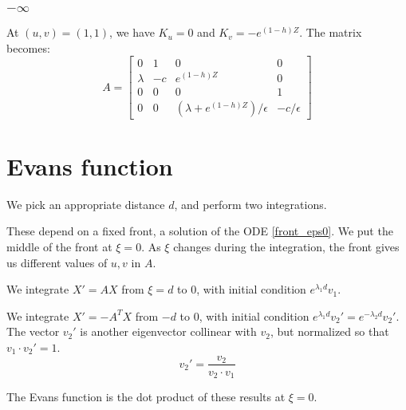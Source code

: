 \documentclass[10pt]{article}
\begin{document}
\subsubsection{$-\infty$}
At $(u,v) = (1,1)$, we have $K_u = 0$ and $K_v = -e^{(1-h)Z}$.
The matrix becomes:
\[
A = \begin{bmatrix}
0 & 1 & 0 & 0 \\
\lambda &  -c  &  e^{(1-h)Z}  & 0 \\
0 & 0 & 0 & 1 \\
0 &  0  &  (\lambda + e^{(1-h)Z})/\epsilon  &  - c / \epsilon
\end{bmatrix}
\]


\section{Evans function}
We pick an appropriate distance $d$, and perform two integrations.

These depend on a fixed front, a solution of the ODE \eqref{front_eps0}.
We put the middle of the front at $\xi = 0$.  As $\xi$ changes during the integration, the front gives us different values of $u,v$ in $A$.

We integrate $X' = AX$ from $\xi = d$ to $0$, with initial condition $e^{\lambda_1 d}v_1$.

We integrate $X' = -A^T X$ from $-d$ to $0$, with initial condition $e^{\lambda_1 d}v_2' = e^{-\lambda_2 d}v_2'$. The vector $v_2'$ is another eigenvector collinear with $v_2$, but normalized so that $v_1 \cdot v_2' = 1$.
\[v_2' = \frac{v_2}{v_2 \cdot v_1}\]

The Evans function is the dot product of these results at $\xi = 0$.
\end{document}
